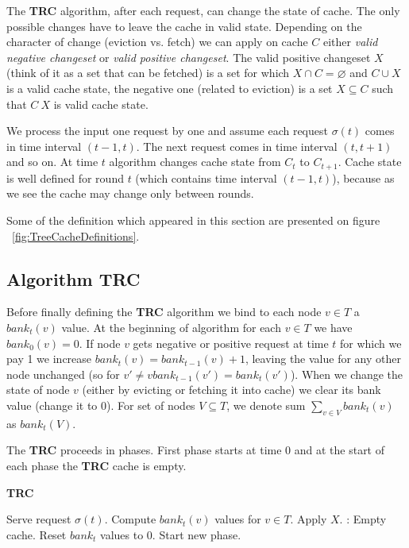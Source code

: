 The \textbf{TRC} algorithm, after each request, can change the state of 
cache. The only possible changes have to leave the cache in valid state. 
Depending on the character of change (eviction vs. fetch) we can apply on cache 
$C$ either \textit{valid negative changeset} or \textit{valid positive 
changeset}. The valid positive changeset $X$ (think of it as a set that can be 
fetched) is a set for which $X \cap C = \varnothing$ and $C \cup X$ 
is a valid cache state, the negative one (related to eviction) is a set $X 
\subseteq C$ such that $C \ X$ is valid cache state.

We process the input one request by one and assume each request $\sigma(t)$ 
comes in 
time interval $(t-1, t)$. The next request comes in time interval $(t, t + 
1)$ and so on. At time $t$ algorithm changes cache state from $C_{t}$ to 
$C_{t+1}$. Cache state is well defined for round $t$ (which contains time 
interval $(t-1, t)$), because as we see the cache may change only between 
rounds.

Some of the definition which appeared in this section are presented on figure 
~\ref{fig:TreeCacheDefinitions}.

\subsection{Algorithm TRC}

Before finally defining the \textbf{TRC} algorithm we bind to each node $v \in 
T$ a $bank_{t}(v)$ value. At the beginning of algorithm for each $v \in T$ we 
have $bank_{0}(v) = 0$. If node $v$ gets negative or positive request at 
time $t$ for which we pay 1 we increase $bank_{t}(v) = bank_{t-1}(v) + 1$, 
leaving the value for any other node unchanged (so for $v' \neq v 
bank_{t-1}(v') = bank_{t}(v')$). When we change the state of node $v$ (either 
by evicting or fetching it into cache) we clear its bank value (change it to 
$0$). For set of nodes $V 
\subseteq T$, we denote sum $\sum_{v \in V} bank_{t}(v)$ as $bank_{t}(V)$.

The \textbf{TRC} proceeds in phases. First phase starts at time 0 and at the 
start of each phase the \textbf{TRC} cache is empty. 
\begin{algorithm}
\caption{\textbf{TRC}}
\label{alg:TRC}
\begin{algorithmic}[1]
  \State Serve request $\sigma(t)$.
  \State Compute $bank_t(v)$ values for $v \in T$.
 \State Apply $X$.
 :
  \State Empty cache.
  \State Reset $bank_t$ values to 0.
  \State Start new phase.
 \EndIf
 \EndIf
\EndFor
  \end{algorithmic}
\end{algorithm}


